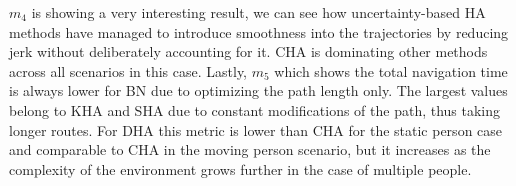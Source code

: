 $m_{4}$ is showing a very interesting result, we can see how uncertainty-based HA methods have managed to introduce smoothness into the trajectories by reducing jerk without deliberately accounting for it. CHA is dominating other methods across all scenarios in this case. Lastly, $m_{5}$ which shows the total navigation time is always lower for BN due to optimizing the path length only. The largest values belong to KHA and SHA due to constant modifications of the path, thus taking longer routes. For DHA this metric is lower than CHA for the static person case and comparable to CHA in the moving person scenario, but it increases as the complexity of the environment grows further in the case of multiple people.%



